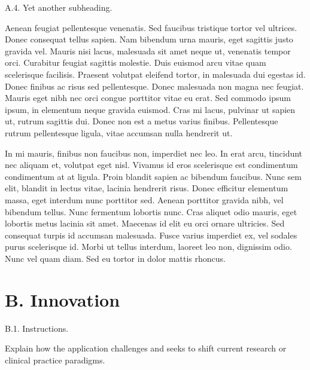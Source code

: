 \documentclass[11pt, notitlepage]{article} %
\begin{document}
\begin{description}
	\item[A.4. Yet another subheading.]{}
\end{description}

Aenean feugiat pellentesque venenatis. Sed faucibus tristique tortor vel ultrices. Donec consequat tellus sapien. Nam bibendum urna mauris, eget sagittis justo gravida vel. Mauris nisi lacus, malesuada sit amet neque ut, venenatis tempor orci. Curabitur feugiat sagittis molestie. Duis euismod arcu vitae quam scelerisque facilisis. Praesent volutpat eleifend tortor, in malesuada dui egestas id. Donec finibus ac risus sed pellentesque. Donec malesuada non magna nec feugiat. Mauris eget nibh nec orci congue porttitor vitae eu erat. Sed commodo ipsum ipsum, in elementum neque gravida euismod. Cras mi lacus, pulvinar ut sapien ut, rutrum sagittis dui. Donec non est a metus varius finibus. Pellentesque rutrum pellentesque ligula, vitae accumsan nulla hendrerit ut.

In mi mauris, finibus non faucibus non, imperdiet nec leo. In erat arcu, tincidunt nec aliquam et, volutpat eget nisl. Vivamus id eros scelerisque est condimentum condimentum at at ligula. Proin blandit sapien ac bibendum faucibus. Nunc sem elit, blandit in lectus vitae, lacinia hendrerit risus. Donec efficitur elementum massa, eget interdum nunc porttitor sed. Aenean porttitor gravida nibh, vel bibendum tellus. Nunc fermentum lobortis nunc. Cras aliquet odio mauris, eget lobortis metus lacinia sit amet. Maecenas id elit eu orci ornare ultricies. Sed consequat turpis id accumsan malesuada. Fusce varius imperdiet ex, vel sodales purus scelerisque id. Morbi ut tellus interdum, laoreet leo non, dignissim odio. Nunc vel quam diam. Sed eu tortor in dolor mattis rhoncus.


\section*{B. Innovation}

\begin{description}
	\item[B.1. Instructions.]{}
\end{description}

Explain how the application challenges and seeks to shift current research or clinical practice paradigms.
\end{document}
